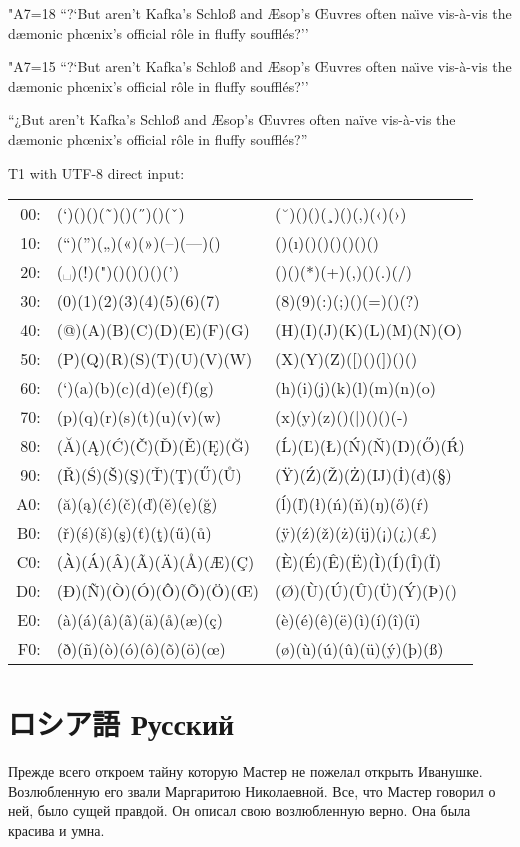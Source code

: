 \documentclass{ujarticle}
\begin{document}
\kcatcode"A7=18%
``?`But aren't Kafka's Schlo{\ss} and {\AE}sop's {\OE}uvres
often na{\"\i}ve  vis-\`a-vis the d{\ae}monic ph{\oe}nix's official r\^ole
in fluffy souffl\'es?''

\kcatcode"A7=15%
``?`But aren't Kafka's Schlo{\ss} and {\AE}sop's {\OE}uvres
often na{\"\i}ve  vis-\`a-vis the d{\ae}monic ph{\oe}nix's official r\^ole
in fluffy souffl\'es?''

“¿But aren’t Kafka’s Schloß and Æsop’s Œuvres
often naïve vis-à-vis the dæmonic phœnix’s official rôle
in fluffy soufflés?”

\noindent
T1 with UTF-8 direct input:\\
\begin{center}\begin{tabular}{r|l|l|}
00:&(`)()()(˜)()(˝)()(ˇ)&(˘)()()(¸)()(‚)(‹)(›)\\
10:&(“)(”)(„)(«)(»)(–)(—)()&()(ı)()()()()()()\\
20:&(␣)(!)(")()()()()(’)&()()(*)(+)(,)()(.)(/)\\
30:&(0)(1)(2)(3)(4)(5)(6)(7)&(8)(9)(:)(;)()(=)()(?)\\
40:&(@)(A)(B)(C)(D)(E)(F)(G)&(H)(I)(J)(K)(L)(M)(N)(O)\\
50:&(P)(Q)(R)(S)(T)(U)(V)(W)&(X)(Y)(Z)([)()(])()()\\
60:&(‘)(a)(b)(c)(d)(e)(f)(g)&(h)(i)(j)(k)(l)(m)(n)(o)\\
70:&(p)(q)(r)(s)(t)(u)(v)(w)&(x)(y)(z)()(|)()()(‐)\\
80:&(Ă)(Ą)(Ć)(Č)(Ď)(Ě)(Ę)(Ğ)&(Ĺ)(Ľ)(Ł)(Ń)(Ň)(Ŋ)(Ő)(Ŕ)\\
90:&(Ř)(Ś)(Š)(Ş)(Ť)(Ţ)(Ű)(Ů)&(Ÿ)(Ź)(Ž)(Ż)(Ĳ)(İ)(đ)(§)\\
A0:&(ă)(ą)(ć)(č)(ď)(ě)(ę)(ğ)&(ĺ)(ľ)(ł)(ń)(ň)(ŋ)(ő)(ŕ)\\
B0:&(ř)(ś)(š)(ş)(ť)(ţ)(ű)(ů)&(ÿ)(ź)(ž)(ż)(ĳ)(¡)(¿)(£)\\
C0:&(À)(Á)(Â)(Ã)(Ä)(Å)(Æ)(Ç)&(È)(É)(Ê)(Ë)(Ì)(Í)(Î)(Ï)\\
D0:&(Ð)(Ñ)(Ò)(Ó)(Ô)(Õ)(Ö)(Œ)&(Ø)(Ù)(Ú)(Û)(Ü)(Ý)(Þ)()\\
E0:&(à)(á)(â)(ã)(ä)(å)(æ)(ç)&(è)(é)(ê)(ë)(ì)(í)(î)(ï)\\
F0:&(ð)(ñ)(ò)(ó)(ô)(õ)(ö)(œ)&(ø)(ù)(ú)(û)(ü)(ý)(þ)(ß)\\
\end{tabular}\end{center}


\section{ロシア語 \selectfont{}Русский}
\selectfont
Прежде всего откроем тайну которую Мастер не пожелал
открыть Иванушке.
Возлюбленную его звали Маргаритою Николаевной.
Все, что Мастер говорил о ней, было сущей правдой.
Он описал свою возлюбленную верно.
Она была красива и умна.
\end{document}
